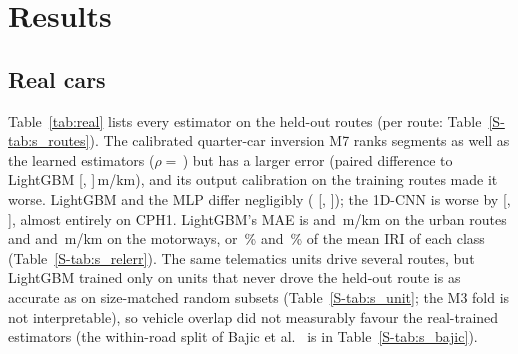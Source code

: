 \section{Results}
\label{sec:results}



\subsection{Real cars}
\label{sec:res_real}
Table~\ref{tab:real} lists every estimator on the held-out routes (per route: Table~\ref{S-tab:s_routes}).
The calibrated quarter-car inversion M7 ranks segments as well as the learned estimators ($\rho=$\,\vrInvRhoWithin) but has a larger error (paired difference to LightGBM \vrInvDfive{} [\vrInvDfiveLo, \vrInvDfiveHi]\,m/km), and its output calibration on the training routes made it worse.
LightGBM and the MLP differ negligibly (\vrMlpDfive{} [\vrMlpDfiveLo, \vrMlpDfiveHi]); the 1D-CNN is worse by \vrCnnDfive{} [\vrCnnDfiveLo, \vrCnnDfiveHi], almost entirely on CPH1.
LightGBM's MAE is \vrGbmMaeCphOne{} and \vrGbmMaeCphSix\,m/km on the urban routes and \vrGbmMaeMwThree{} and \vrGbmMaeMwThirteen\,m/km on the motorways, or \reGbmUrban\,\% and \reGbmMotorway\,\% of the mean IRI of each class (Table~\ref{S-tab:s_relerr}).
The same telematics units drive several routes, but LightGBM trained only on units that never drove the held-out route is as accurate as on size-matched random subsets (Table~\ref{S-tab:s_unit}; the M3 fold is not interpretable), so vehicle overlap did not measurably favour the real-trained estimators (the within-road split of Bajic et al.~\cite{bajic2021ml} is in Table~\ref{S-tab:s_bajic}).


